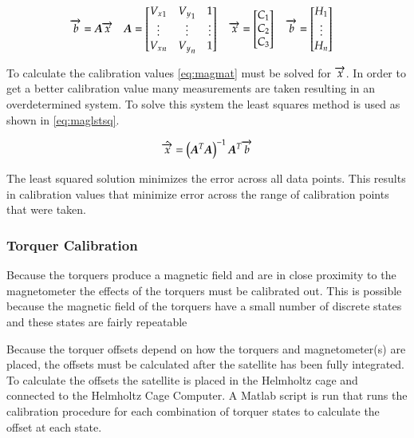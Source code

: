 \begin{equation}
    \overrightarrow{b}=\boldsymbol{A} \overrightarrow{x} \quad
    \boldsymbol{A} =
    \begin{bmatrix}
        {V_x}_1 & {V_y}_1 & 1 \\
        \vdots & \vdots & \vdots\\
        {V_x}_n & {V_y}_n & 1 \\
    \end{bmatrix} \quad
    \overrightarrow{x} = 
    \begin{bmatrix}
        C_1 \\
        C_2 \\
        C_3 \\
    \end{bmatrix} \quad
    \overrightarrow{b} = 
    \begin{bmatrix}
        H_1 \\
        \vdots \\
        H_n \\
    \end{bmatrix} \quad
    \label{eq:magmat}
\end{equation}

To calculate the calibration values \autoref{eq:magmat} must be solved for $\overrightarrow{x}$. In order to get a better calibration value many measurements are taken resulting in an overdetermined system. To solve this system the least squares method is used as shown in \autoref{eq:maglstsq}.

\begin{equation}
    \hat{\overrightarrow{x}} = \left(\boldsymbol{A} ^T \boldsymbol{A} \right) ^ {-1} \boldsymbol{A} ^T \overrightarrow{b}
    \label{eq:maglstsq}
\end{equation}

The least squared solution minimizes the error across all data points. This results in calibration values that minimize error across the range of calibration points that were taken.

\subsubsection{Torquer Calibration}

Because the torquers produce a magnetic field and are in close proximity to the magnetometer the effects of the torquers must be calibrated out. This is possible because the magnetic field of the torquers have a small number of discrete states and these states are fairly repeatable 

Because the torquer offsets depend on how the torquers and magnetometer(s) are placed, the offsets must be calculated after the satellite has been fully integrated. To calculate the offsets the satellite is placed in the Helmholtz cage and connected to the Helmholtz Cage Computer. A Matlab script is run that runs the calibration procedure for each combination of torquer states to calculate the offset at each state. 

